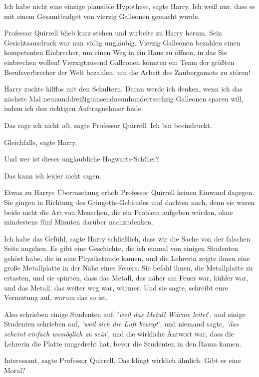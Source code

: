 \glqq Ich habe nicht eine einzige plausible Hypothese\grqq{}, sagte Harry. \glqq
Ich weiß nur, dass es mit einem Gesamtbudget von vierzig Galleonen gemacht
wurde.\grqq{}

Professor Quirrell blieb kurz stehen und wirbelte zu Harry herum. Sein
Gesichtsausdruck war nun völlig ungläubig. \glqq Vierzig Galleonen bezahlen
einen kompetenten Einbrecher, um einen Weg in ein Haus zu öffnen, in das Sie
einbrechen wollen! Vierzigtausend Galleonen könnten ein Team der größten
Berufsverbrecher der Welt bezahlen, um die Arbeit des Zaubergamots zu
stören!\grqq{}

Harry zuckte hilflos mit den Schultern. \glqq Daran werde ich denken, wenn ich
das nächste Mal neununddreißigtausendneunhundertsechzig Galleonen sparen will,
indem ich den richtigen Auftragnehmer finde.\grqq{}

\glqq Das sage ich nicht oft\grqq{}, sagte Professor Quirrell. \glqq Ich bin
beeindruckt.\grqq{}

\glqq Gleichfalls\grqq{}, sagte Harry.

\glqq Und wer ist dieser unglaubliche Hogwarts-Schüler?\grqq{}

\glqq Das kann ich leider nicht sagen.\grqq{}

Etwas zu Harrys Überraschung erhob Professor Quirrell keinen Einwand dagegen.
Sie gingen in Richtung des Gringotts-Gebäudes und dachten nach, denn sie waren
beide nicht die Art von Menschen, die ein Problem aufgeben würden, ohne
mindestens fünf Minuten darüber nachzudenken.

\glqq Ich habe das Gefühl\grqq{}, sagte Harry schließlich, \glqq dass wir die
Sache von der falschen Seite angehen. Es gibt eine Geschichte, die ich einmal
von einigen Studenten gehört habe, die in eine Physikstunde kamen, und die
Lehrerin zeigte ihnen eine große Metallplatte in der Nähe eines Feuers. Sie
befahl ihnen, die Metallplatte zu ertasten, und sie spürten, dass das Metall,
das näher am Feuer war, kühler war, und das Metall, das weiter weg war, wärmer.
Und sie sagte, schreibt eure Vermutung auf, warum das so ist.

Also schrieben einige Studenten auf, '\emph{weil das Metall Wärme leitet}', und
einige Studenten schrieben auf, \emph{'weil sich die Luft bewegt}', und niemand
sagte,\emph{ 'das scheint einfach unmöglich zu sein',} und die wirkliche Antwort
war, dass die Lehrerin die Platte umgedreht hat, bevor die Studenten in den Raum
kamen.\grqq{}

\glqq Interessant\grqq{}, sagte Professor Quirrell. \glqq Das klingt wirklich
ähnlich. Gibt es eine Moral?\grqq{}

